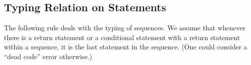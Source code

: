 


\subsection{Typing Relation on Statements}

The following rule deals with the typing of sequences. We assume that
whenever there is a return statement or a conditional statement with a return statement within a
sequence, it is the last statement in the sequence.
(One could consider a ``dead code'' error otherwise.)

